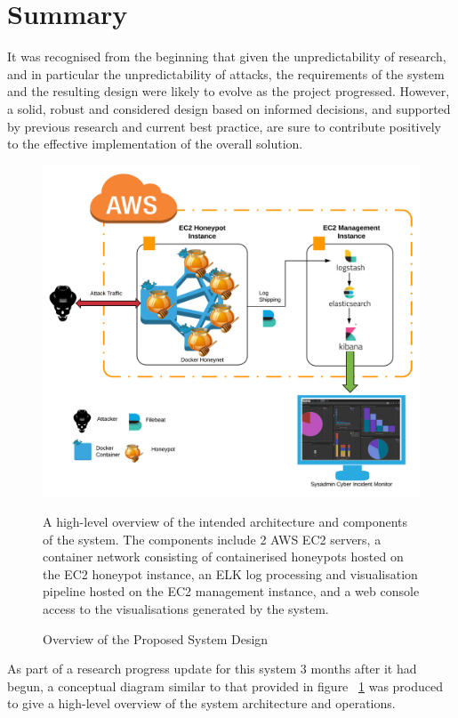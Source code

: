 \section{Summary} \label{DesignSummary}
It was recognised from the beginning that given the unpredictability of research, and in particular the unpredictability of attacks, the requirements of the system and the resulting design were likely to evolve as the project progressed. However, a solid, robust and considered design based on informed decisions, and supported by previous research and current best practice, are sure to contribute positively to the effective implementation of the overall solution.

\begin{figure}[ht]
      \centering
      \includegraphics[width=160mm, scale=1]{Images/Cyber_Incident_Monitor_Architecture_Original_Design.png}
      \caption{Overview of the Proposed System Design} 
      \medskip
	  \small
		A high-level overview of the intended architecture and components of the system. The components include 2 AWS EC2 servers, a container network consisting of containerised honeypots hosted on the EC2 honeypot instance, an ELK log processing and visualisation pipeline hosted on the EC2 management instance, and a web console access to the visualisations generated by the system.
\label{fig:CyberIncidentMonitorSystemOriginalDesign}
\end{figure}


As part of a research progress update for this system 3 months after it had begun, a conceptual diagram similar to that provided in figure ~\ref{fig:CyberIncidentMonitorSystemOriginalDesign} was produced to give a high-level overview of the system architecture and operations. 


